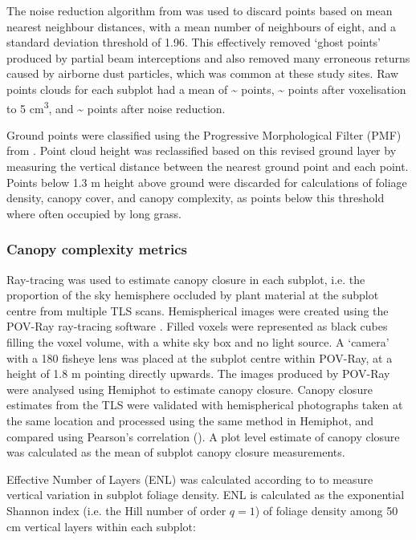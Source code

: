 \documentclass[11pt,a4paper]{article}
\begin{document}
The noise reduction algorithm from \citet{Rusu2008} was used to discard points based on mean nearest neighbour distances, with a mean number of neighbours of eight, and a standard deviation threshold of 1.96. This effectively removed `ghost points' produced by partial beam interceptions and also removed many erroneous returns caused by airborne dust particles, which was common at these study sites. Raw points clouds for each subplot had a mean of \textasciitilde{}\rawpt{} points, \textasciitilde{}\voxelpt{} points after voxelisation to 5 cm\textsuperscript{3}, and \textasciitilde{}\subpt{} points after noise reduction. 

Ground points were classified using the Progressive Morphological Filter (PMF) from \citet{Zhang2003}. Point cloud height was reclassified based on this revised ground layer by measuring the vertical distance between the nearest ground point and each point. Points below 1.3 m height above ground were discarded for calculations of foliage density, canopy cover, and canopy complexity, as points below this threshold where often occupied by long grass.

\subsubsection{Canopy complexity metrics}

Ray-tracing was used to estimate canopy closure in each subplot, i.e. the proportion of the sky hemisphere occluded by plant material at the subplot centre from multiple TLS scans. Hemispherical images were created using the POV-Ray ray-tracing software \citep{Povray2004}. Filled voxels were represented as black cubes filling the voxel volume, with a white sky box and no light source. A `camera' with a 180\textdegree{} fisheye lens was placed at the subplot centre within POV-Ray, at a height of 1.8 m pointing directly upwards. The images produced by POV-Ray were analysed using Hemiphot \citep{HemiPhot} to estimate canopy closure. Canopy closure estimates from the TLS were validated with hemispherical photographs taken at the same location and processed using the same method in Hemiphot, and compared using Pearson's correlation (\hemiCor{}). A plot level estimate of canopy closure was calculated as the mean of subplot canopy closure measurements.

Effective Number of Layers (ENL) was calculated according to \citet{Ehbrecht2016} to measure vertical variation in subplot foliage density. ENL is calculated as the exponential Shannon index (i.e. the Hill number of order $q=1$) of foliage density among 50 cm vertical layers within each subplot:
\end{document}
